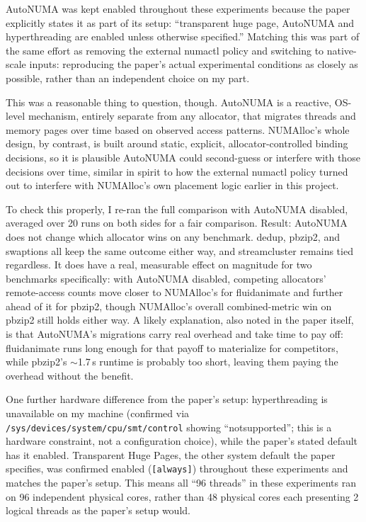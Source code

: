 \documentclass[11pt,a4paper]{article}
\begin{document}
AutoNUMA was kept enabled throughout these experiments because the paper explicitly states it as part of its setup: ``transparent huge page, AutoNUMA and hyperthreading are enabled unless otherwise specified.'' Matching this was part of the same effort as removing the external numactl policy and switching to native-scale inputs: reproducing the paper's actual experimental conditions as closely as possible, rather than an independent choice on my part.

This was a reasonable thing to question, though. AutoNUMA is a reactive, OS-level mechanism, entirely separate from any allocator, that migrates threads and memory pages over time based on observed access patterns. NUMAlloc's whole design, by contrast, is built around static, explicit, allocator-controlled binding decisions, so it is plausible AutoNUMA could second-guess or interfere with those decisions over time, similar in spirit to how the external numactl policy turned out to interfere with NUMAlloc's own placement logic earlier in this project.

To check this properly, I re-ran the full comparison with AutoNUMA disabled, averaged over 20 runs on both sides for a fair comparison. Result: AutoNUMA does not change which allocator wins on any benchmark. dedup, pbzip2, and swaptions all keep the same outcome either way, and streamcluster remains tied regardless. It does have a real, measurable effect on magnitude for two benchmarks specifically: with AutoNUMA disabled, competing allocators' remote-access counts move closer to NUMAlloc's for fluidanimate and further ahead of it for pbzip2, though NUMAlloc's overall combined-metric win on pbzip2 still holds either way. A likely explanation, also noted in the paper itself, is that AutoNUMA's migrations carry real overhead and take time to pay off: fluidanimate runs long enough for that payoff to materialize for competitors, while pbzip2's $\sim$1.7\,s runtime is probably too short, leaving them paying the overhead without the benefit.

One further hardware difference from the paper's setup: hyperthreading is unavailable on my machine (confirmed via \texttt{/sys/devices/system/cpu/smt/control} showing ``notsupported''; this is a hardware constraint, not a configuration choice), while the paper's stated default has it enabled. Transparent Huge Pages, the other system default the paper specifies, was confirmed enabled (\texttt{[always]}) throughout these experiments and matches the paper's setup. This means all ``96 threads'' in these experiments ran on 96 independent physical cores, rather than 48 physical cores each presenting 2 logical threads as the paper's setup would.
\end{document}
